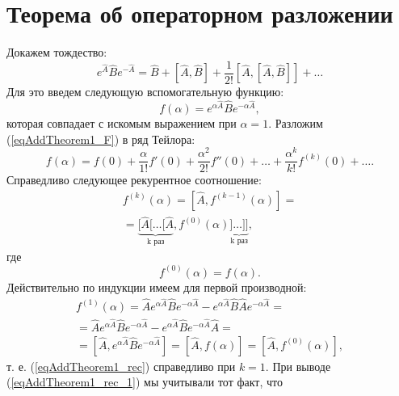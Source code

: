 \section{Теорема об операторном разложении}
\label{AddTheorem1}

Докажем тождество:
\begin{equation}
e^{\hat{A}}\hat{B}e^{-\hat{A}} = 
\hat{B} + \left[\hat{A},\hat{B}\right] + 
\frac{1}{2!} \left[\hat{A},\left[\hat{A},\hat{B}\right]\right] + \dots
\label{eqAddTheorem1_Main}
\end{equation}
Для это введем следующую вспомогательную функцию:
\begin{equation}
f\left(\alpha\right) = 
e^{\alpha\hat{A}}\hat{B}e^{-\alpha\hat{A}},
\label{eqAddTheorem1_F}
\end{equation}
которая совпадает с искомым выражением при $\alpha = 1$. Разложим
(\ref{eqAddTheorem1_F}) в ряд Тейлора:
\begin{equation}
f\left(\alpha\right) = 
f\left(0\right) + \frac{\alpha}{1!}f'\left(0\right) +
\frac{\alpha^2}{2!}f''\left(0\right) + 
\dots +
\frac{\alpha^k}{k!}f^{(k)}\left(0\right) + \dots.
\label{eqAddTheorem1_T}
\end{equation}
Справедливо следующее рекурентное соотношение:
\begin{eqnarray}
f^{(k)}\left(\alpha\right) = \left[\hat{A},
  f^{(k-1)}\left(\alpha\right)\right] = 
\nonumber \\
=
\underbrace{
[\hat{A}[\dots[\hat{A}}_{\mbox{k
  раз}},
f^{(0)}\left(\alpha\right)
\underbrace{]\dots]]}_{\mbox{k
  раз}},
\label{eqAddTheorem1_rec}
\end{eqnarray}
где 
\[
f^{(0)}\left(\alpha\right) = f\left(\alpha\right).
\]
Действительно по индукции имеем для первой производной:
\begin{eqnarray}
f^{(1)}\left(\alpha\right) = \hat{A}
  e^{\alpha\hat{A}}\hat{B}e^{-\alpha\hat{A}} -
  e^{\alpha\hat{A}}\hat{B}\hat{A}e^{-\alpha\hat{A}} = 
\nonumber \\
= \hat{A}
  e^{\alpha\hat{A}}\hat{B}e^{-\alpha\hat{A}} -
  e^{\alpha\hat{A}}\hat{B}e^{-\alpha\hat{A}}\hat{A} = 
\nonumber \\
=
\left[\hat{A}, e^{\alpha\hat{A}}\hat{B}e^{-\alpha\hat{A}}\right] = 
\left[\hat{A}, f\left(\alpha\right)\right] = 
\left[\hat{A}, f^{(0)}\left(\alpha\right)\right],
\label{eqAddTheorem1_rec_1}
\end{eqnarray}
т. е. (\ref{eqAddTheorem1_rec}) справедливо при $k = 1$. При выводе
(\ref{eqAddTheorem1_rec_1}) мы учитывали тот факт, что 
